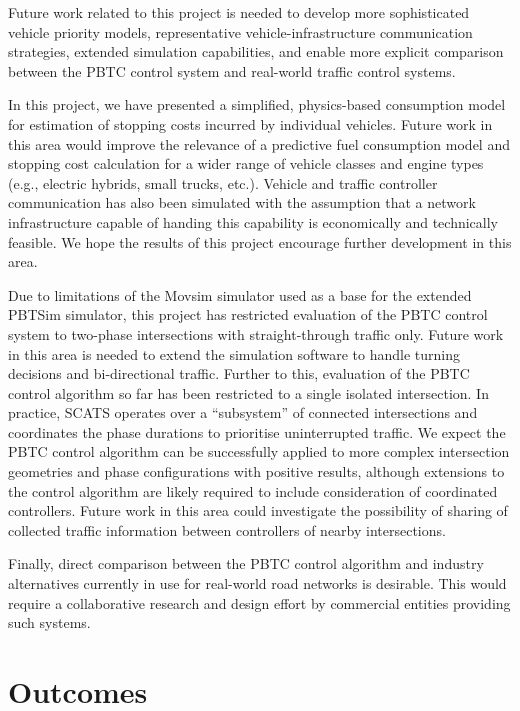Future work related to this project is needed to develop more sophisticated vehicle priority models, representative vehicle-infrastructure communication strategies, extended simulation capabilities, and enable more explicit comparison between the PBTC control system and real-world traffic control systems.

In this project, we have presented a simplified, physics-based consumption model for estimation of stopping costs incurred by individual vehicles. Future work in this area would improve the relevance of a predictive fuel consumption model and stopping cost calculation for a wider range of vehicle classes and engine types (e.g., electric hybrids, small trucks, etc.). Vehicle and traffic controller communication has also been simulated with the assumption that a network infrastructure capable of handing this capability is economically and technically feasible. We hope the results of this project encourage further development in this area.

Due to limitations of the Movsim simulator used as a base for the extended PBTSim simulator, this project has restricted evaluation of the PBTC control system to two-phase intersections with straight-through traffic only. Future work in this area is needed to extend the simulation software to handle turning decisions and bi-directional traffic. Further to this, evaluation of the PBTC control algorithm so far has been restricted to a single isolated intersection. In practice, SCATS operates over a ``subsystem'' of connected intersections and coordinates the phase durations to prioritise uninterrupted traffic. We expect the PBTC control algorithm can be successfully applied to more complex intersection geometries and phase configurations with positive results, although extensions to the control algorithm are likely required to include consideration of coordinated controllers. Future work in this area could investigate the possibility of sharing of collected traffic information between controllers of nearby intersections.

Finally, direct comparison between the PBTC control algorithm and industry alternatives currently in use for real-world road networks is desirable. This would require a collaborative research and design effort by commercial entities providing such systems.

\section{Outcomes}



